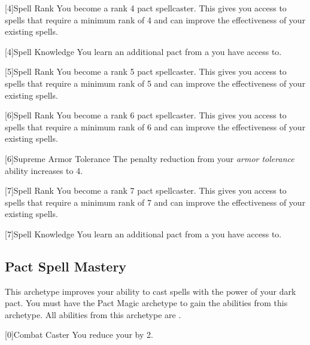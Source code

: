         [4]{Spell Rank} You become a rank 4 pact spellcaster.
        This gives you access to spells that require a minimum rank of 4 and can improve the effectiveness of your existing spells.

        [4]{Spell Knowledge} You learn an additional pact  from a  you have access to.

        [5]{Spell Rank} You become a rank 5 pact spellcaster.
        This gives you access to spells that require a minimum rank of 5 and can improve the effectiveness of your existing spells.

        [6]{Spell Rank} You become a rank 6 pact spellcaster.
        This gives you access to spells that require a minimum rank of 6 and can improve the effectiveness of your existing spells.

        [6]{Supreme Armor Tolerance} The penalty reduction from your \textit{armor tolerance} ability increases to 4.

        [7]{Spell Rank} You become a rank 7 pact spellcaster.
        This gives you access to spells that require a minimum rank of 7 and can improve the effectiveness of your existing spells.

        [7]{Spell Knowledge} You learn an additional pact  from a  you have access to.

    \newpage
    \subsection{Pact Spell Mastery}
        This archetype improves your ability to cast spells with the power of your dark pact.
        You must have the Pact Magic archetype to gain the abilities from this archetype.
        All abilities from this archetype are .

        [0]{Combat Caster} You reduce your  by 2.

